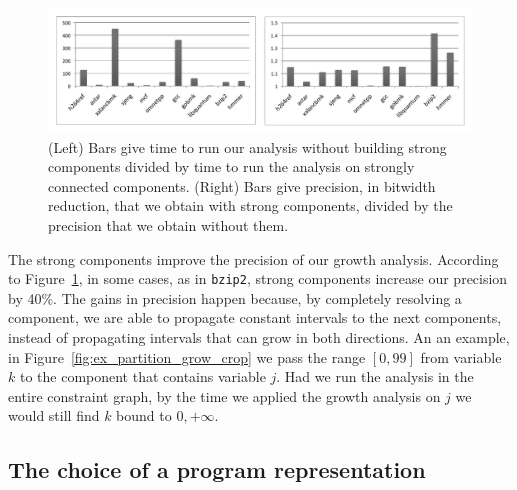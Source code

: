 \documentclass[times]{speauth}
\begin{document}
\begin{figure}[t!]
\begin{center}
\includegraphics[width=\textwidth]{images/impactSCC}
\end{center}
\caption{\label{fig:impactSCC}
(Left) Bars give time to run our analysis without building strong components
divided by time to run the analysis on strongly connected components.
(Right) Bars give precision, in bitwidth reduction, that we obtain with strong
components, divided by the precision that we obtain without them.
}
\end{figure}

The strong components improve the precision of our growth analysis.
According to Figure~\ref{fig:impactSCC}, in some cases, as in \texttt{bzip2},
strong components increase our precision by 40\%.
The gains in precision happen because, by completely resolving a component,
we are able to propagate constant intervals to the next components, instead
of propagating intervals that can grow in both directions.
An an example, in Figure~\ref{fig:ex_partition_grow_crop} we pass the range
$[0, 99]$ from variable $k$ to the component that contains variable $j$.
Had we run the analysis in the entire constraint graph, by the time we
applied the growth analysis on $j$ we would still find $k$ bound to
$0, +\infty$.


\subsection{The choice of a program representation}
\label{sub:program_rep}
\end{document}
